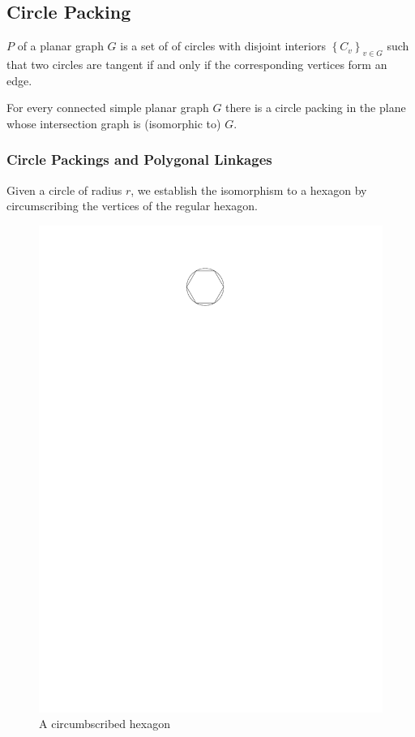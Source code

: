 \subsection{Circle Packing}
\begin{definition}\label{def:circlePacking}
$P$ of a planar graph $G$ is a set of of circles with disjoint
interiors $\left\lbrace C_v \right\rbrace_{v \in G} $ such that two
circles are tangent if and only if the corresponding vertices form an edge.
\cite{arXiv13113363v1}
\end{definition} 


\begin{thm}\label{thm2-1}
For every connected simple planar graph $G$ there is a circle packing in the plane whose intersection graph is (isomorphic to) $G$.
\end{thm}
\subsubsection{Circle Packings and Polygonal Linkages}
Given a circle of radius $r$, we establish the isomorphism to a hexagon by
circumscribing the vertices of the regular hexagon.
\begin{figure}[h]
\begin{center}
\includegraphics{graphics/circumscribedHexagon.pdf}
\caption{A circumbscribed hexagon}
\end{center}
\end{figure}
